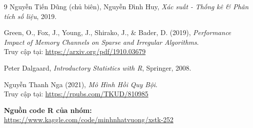 \begin{thebibliography}{9}
\thispagestyle{fancy}
Nguyễn Tiến Dũng (chủ biên), Nguyễn Đình Huy, 
\textit{Xác suất - Thống kê \& Phân tích số liệu}, 2019.

Green, O., Fox, J., Young, J., Shirako, J., \& Bader, D. (2019), 
\textit{Performance Impact of Memory Channels on Sparse and Irregular Algorithms}.\\
Truy cập tại: \url{https://arxiv.org/pdf/1910.03679}

Peter Dalgaard, 
\textit{Introductory Statistics with R}, Springer, 2008.

Nguyễn Thanh Nga (2021), 
\textit{Mô Hình Hồi Quy Bội}.\\
Truy cập tại: \url{https://rpubs.com/TKUD/810985}

\end{thebibliography}

\vspace{1em}

\noindent\textbf{Nguồn code R của nhóm:} \\
\url{https://www.kaggle.com/code/minhnhatvuong/xstk-252}